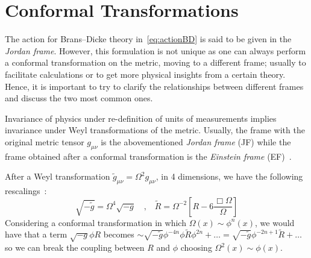 \section{Conformal Transformations}
The action for Brans–Dicke theory in~\eqref{eq:actionBD} is said to be given in the \textit{Jordan frame}. However, this formulation is not unique as one can always perform a conformal transformation on the metric, moving to a different frame; usually to facilitate calculations or to get more physical insights from a certain theory.
Hence, it is important to try to clarify the relationships between different frames and discuss the two most common ones.

Invariance of physics under re-definition of units of measurements implies invariance under Weyl transformations of the metric.
Usually, the frame with the original metric tensor $g_{\mu\nu}$ is the abovementioned \textit{Jordan frame} (JF) while the frame obtained after a conformal transformation is the \textit{Einstein frame} (EF)~\cite{GiontiSJ:2023tgx}.

After a Weyl transformation $\tilde{g}_{\mu\nu} = \Omega^2 g_{\mu\nu}$, in 4 dimensions, we have the following rescalings~\cite{Faraoni:1998qx}:
\begin{equation}\label{eq:conformaltransformations}
    \sqrt{-\tilde{g}} = \Omega^{4} \sqrt{-g} \quad \text{,}\quad 
    \tilde{R} = \Omega^{-2} \left[ R - 6\frac{\Box \Omega}{\Omega} \right]
\end{equation}
Considering a conformal transformation in which $\Omega(x)\sim \phi^n(x)$, we would have that a term $\sqrt{-g}\phi R$ becomes
$\sim \sqrt{-\tilde{g}}\phi^{-4n}\phi \tilde{R} \phi^{2n} + \dots = \sqrt{-\tilde{g}}\phi^{-2n +1} \tilde{R} + \dots$ so we can break the coupling between $R$ and $\phi$ choosing 
$\Omega^2(x)\sim \phi(x)$.

